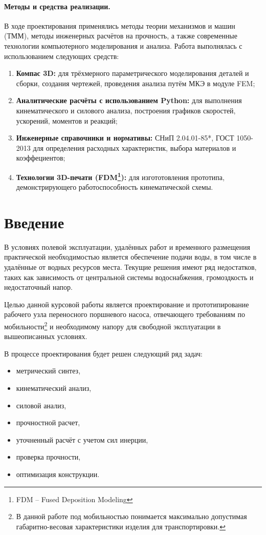 \documentclass[12pt]{extarticle}
\begin{document}
\paragraph{Методы и средства реализации.}
В ходе проектирования применялись методы теории механизмов и машин (ТММ), методы инженерных расчётов на прочность,
а также современные технологии компьютерного моделирования и анализа.
Работа выполнялась с использованием следующих средств:
\begin{enumerate}
    \item \textbf{Компас 3D:} для трёхмерного параметрического моделирования деталей и сборки, создания чертежей,
        проведения анализа путём МКЭ в модуле FEM;
    \item \textbf{Аналитические расчёты с использованием Python:} для выполнения кинематического и силового анализа,
        построения графиков скоростей, ускорений, моментов и реакций;
    \item \textbf{Инженерные справочники и нормативы:} СНиП 2.04.01-85*, ГОСТ 1050-2013 для определения
        расходных характеристик, выбора материалов и коэффециентов;
    \item \textbf{Технологии 3D-печати (FDM\footnote{FDM -- Fused Deposition Modeling}):} для изгототовления прототипа, демонстрирующего работоспособность
        кинематической схемы.
\end{enumerate}

\clearpage
\section{Введение}
В условиях полевой эксплуатации, удалённых работ и временного размещения практической необходимостью является
обеспечение подачи воды, в том числе в удалённые от водных ресурсов места. Текущие решения имеют ряд недостатков,
таких как зависимость от центральной системы водоснабжения, громоздкость и недостаточный напор.

Целью данной курсовой работы является проектирование и прототипирование рабочего узла переносного поршневого насоса,
отвечающего требованиям по мобильности\footnote{В данной работе под мобильностью понимается максимально допустимая
габаритно-весовая характеристики изделия для транспортировки.} и необходимому напору для свободной эксплуатации
в вышеописанных условиях.

В процессе проектирования будет решен следующий ряд задач:
\begin{itemize}
    \item метрический синтез,
    \item кинематический анализ,
    \item силовой анализ,
    \item прочностной расчет,
    \item уточненный расчёт с учетом сил инерции,
    \item проверка прочности,
    \item оптимизация конструкции.
\end{itemize}
\end{document}

